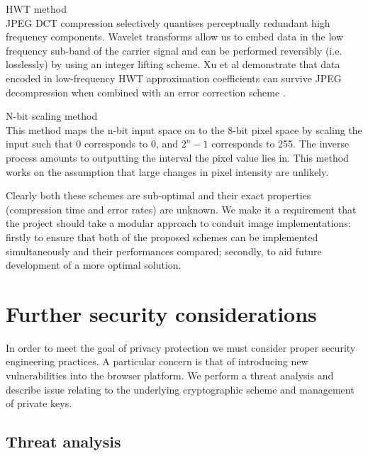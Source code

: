 \begin{sdesc}

    \item[HWT method] \hfill \\ JPEG DCT compression selectively quantises perceptually redundant high frequency components. Wavelet transforms allow us to embed data in the low frequency sub-band of the carrier signal and can be performed reversibly (i.e. losslessly) by using an integer lifting scheme. Xu et al demonstrate that data encoded in low-frequency HWT approximation coefficients can survive JPEG decompression when combined with an error correction scheme \cite{haar}.
    
    \item[N-bit scaling method] \hfill \\ This method maps the n-bit input space on to the 8-bit pixel space by scaling the input such that 0 corresponds to 0, and $2^n - 1$ corresponds to 255. The inverse process amounts to outputting the interval the pixel value lies in. This method works on the assumption that large changes in pixel intensity are unlikely.

\end{sdesc}

Clearly both these schemes are sub-optimal and their exact properties (compression time and error rates) are unknown. We make it a requirement that the project should take a modular approach to conduit image implementations: firstly to ensure that both of the proposed schemes can be implemented simultaneously and their performances compared; secondly, to aid future development of a more optimal solution.



\FloatBarrier 
\section{Further security considerations}
\label{sec:security}

In order to meet the goal of privacy protection we must consider proper security engineering practices. A particular concern is that of introducing new vulnerabilities into the browser platform. We perform a threat analysis and describe issue relating to the underlying cryptographic scheme and management of private keys.

\FloatBarrier
\subsection{Threat analysis}
\label{ssec:threat}

